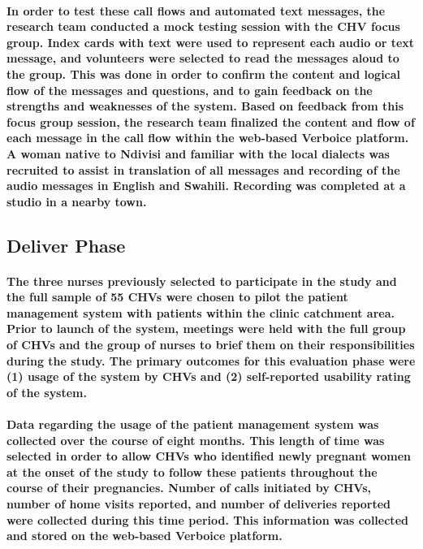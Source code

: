 \paragraph{In order to test these call flows and automated text messages, the research team conducted a mock testing session with the CHV focus group. Index cards with text were used to represent each audio or text message, and volunteers were selected to read the messages aloud to the group. This was done in order to confirm the content and logical flow of the messages and questions, and to gain feedback on the strengths and weaknesses of the system. Based on feedback from this focus group session, the research team finalized the content and flow of each message in the call flow within the web-based Verboice platform. A woman native to Ndivisi and familiar with the local dialects was recruited to assist in translation of all messages and recording of the audio messages in English and Swahili. Recording was completed at a studio in a nearby town.}


\subsection{Deliver Phase}
\paragraph{The three nurses previously selected to participate in the study and the full sample of 55 CHVs were chosen to pilot the patient management system with patients within the clinic catchment area. Prior to launch of the system, meetings were held with the full group of CHVs and the group of nurses to brief them on their responsibilities during the study. The primary outcomes for this evaluation phase were (1) usage of the system by CHVs and (2) self-reported usability rating of the system.}

\paragraph{Data regarding the usage of the patient management system  was collected over the course of eight months. This length of time was selected in order to allow CHVs who identified newly pregnant women at the onset of the study to follow these patients throughout the course of their pregnancies. Number of calls initiated by CHVs, number of home visits reported, and number of deliveries reported were collected during this time period. This information was collected and stored on the web-based Verboice platform.}

